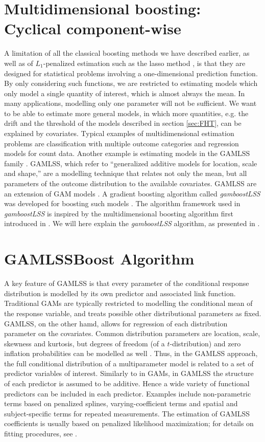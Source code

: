 \section{Multidimensional boosting: Cyclical component-wise}
A limitation of all the classical boosting methods we have described earlier, as well as of $L_1$-penalized estimation such as the lasso method \citep{lasso}, is that they are designed for statistical problems involving a one-dimensional prediction function. By only considering such functions, we are restricted to estimating models which only model a single quantity of interest, which is almost always the mean.
In many applications, modelling only one parameter will not be sufficient. We want to be able to estimate more general models, in which more quantities, e.g. the drift and the threshold of the models described in section \ref{sec:FHT}, can be explained by covariates. Typical examples of multidimensional estimation problems are classification with multiple outcome categories and regression models for count data. Another example is estimating models in the GAMLSS family \citep{gamlss}. GAMLSS, which refer to ``generalized additive models for location, scale and shape,'' are a modelling technique that relates not only the mean, but all parameters of the outcome distribution to the available covariates. GAMLSS are an extension of GAM models \citep{gam-book}. A gradient boosting algorithm called \textit{gamboostLSS} was developed for boosting such models \citep{gamboostlss-paper}. The algorithm framework used in \textit{gamboostLSS} is inspired by the multidimensional boosting algorithm first introduced in \citet{schmid}. We will here explain the \textit{gamboostLSS} algorithm, as presented in \citet{gamboostlss-paper}.

\section{GAMLSSBoost Algorithm}
A key feature of GAMLSS is that every parameter of the conditional response distribution is modelled by its own predictor and associated link function.
Traditional GAMs \citep{gam-book} are typically restricted to modelling the conditional mean of the response variable,
and treats possible other distributional parameters as fixed. GAMLSS, on the other hamd, allows for regression of each distribution parameter
on the covariates. Common distribution parameters are location, scale, skewness and kurtosis, but degrees of freedom (of a $t$-distribution)
and zero inflation probabilities can be modelled as well \citep{gamboostlss-paper}. Thus, in the GAMLSS approach, the full conditional
distribution of a multiparameter model is related to a set of predictor variables of interest. Similarly to in GAMs, in GAMLSS the structure
of each predictor is assumed to be additive. Hence a wide variety of functional predictors can be included in each predictor.
Examples include non-parametric terms based on penalized splines, varying-coefficient terms and spatial and subject-specific terms for
repeated measurements. The estimation of GAMLSS coefficients is usually based on penalized likelihood maximization; for details
on fitting procedures, see \citet{gamlss}.

